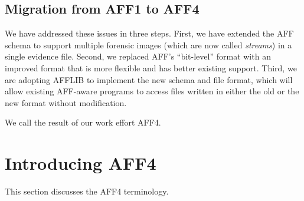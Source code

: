 \documentclass[10pt, conference]{IEEEtran}
\begin{document}
\subsection{Migration from AFF1 to AFF4}

We have addressed these issues in three steps. First, we have extended
the AFF schema to support multiple forensic images (which are now
called \emph{streams}) in a single evidence file. Second, we replaced
AFF's ``bit-level'' format with an improved format that is more
flexible and has better existing support. Third, we are adopting
AFFLIB to implement the new schema and file format, which will allow
existing AFF-aware programs to access files written in either the old
or the new format without modification.

We call the result of our work effort AFF4.

\section{Introducing AFF4}

This section discusses the AFF4 terminology. 

\end{document}
